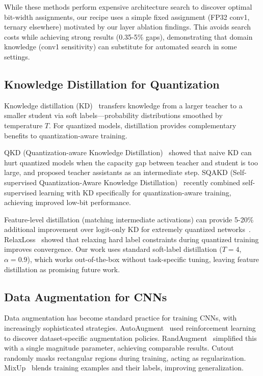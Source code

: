While these methods perform expensive architecture search to discover optimal bit-width assignments, our recipe uses a simple fixed assignment (FP32 conv1, ternary elsewhere) motivated by our layer ablation findings. This avoids search costs while achieving strong results (0.35-5\% gaps), demonstrating that domain knowledge (conv1 sensitivity) can substitute for automated search in some settings.

\subsection{Knowledge Distillation for Quantization}

Knowledge distillation (KD)~\cite{hinton2015distilling} transfers knowledge from a larger teacher to a smaller student via soft labels—probability distributions smoothed by temperature $T$. For quantized models, distillation provides complementary benefits to quantization-aware training.

QKD (Quantization-aware Knowledge Distillation)~\cite{kim2019qkd} showed that naive KD can hurt quantized models when the capacity gap between teacher and student is too large, and proposed teacher assistants as an intermediate step. SQAKD (Self-supervised Quantization-Aware Knowledge Distillation)~\cite{zhao2024sqakd} recently combined self-supervised learning with KD specifically for quantization-aware training, achieving improved low-bit performance.

Feature-level distillation (matching intermediate activations) can provide 5-20\% additional improvement over logit-only KD for extremely quantized networks~\cite{elthakeb2020dcq}. RelaxLoss~\cite{kim2021relaxloss} showed that relaxing hard label constraints during quantized training improves convergence. Our work uses standard soft-label distillation ($T=4$, $\alpha=0.9$), which works out-of-the-box without task-specific tuning, leaving feature distillation as promising future work.

\subsection{Data Augmentation for CNNs}

Data augmentation has become standard practice for training CNNs, with increasingly sophisticated strategies. AutoAugment~\cite{cubuk2019autoaugment} used reinforcement learning to discover dataset-specific augmentation policies. RandAugment~\cite{cubuk2020randaugment} simplified this with a single magnitude parameter, achieving comparable results. Cutout~\cite{devries2017cutout} randomly masks rectangular regions during training, acting as regularization. MixUp~\cite{zhang2018mixup} blends training examples and their labels, improving generalization.

